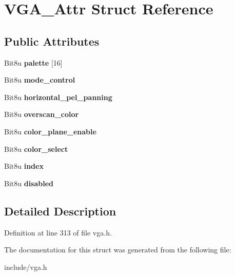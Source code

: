 \hypertarget{structVGA__Attr}{\section{V\-G\-A\-\_\-\-Attr Struct Reference}
\label{structVGA__Attr}
}
\subsection*{Public Attributes}
\begin{DoxyCompactItemize}
\item 
\hypertarget{structVGA__Attr_ad99b88df8836cef9a71a302eef58c6bc}{Bit8u {\bfseries palette} \mbox{[}16\mbox{]}}\label{structVGA__Attr_ad99b88df8836cef9a71a302eef58c6bc}

\item 
\hypertarget{structVGA__Attr_a1b1f9b873cb25af5b2258157ec294b67}{Bit8u {\bfseries mode\-\_\-control}}\label{structVGA__Attr_a1b1f9b873cb25af5b2258157ec294b67}

\item 
\hypertarget{structVGA__Attr_a57f5441e85ade86c8ac8a47db2eee8a6}{Bit8u {\bfseries horizontal\-\_\-pel\-\_\-panning}}\label{structVGA__Attr_a57f5441e85ade86c8ac8a47db2eee8a6}

\item 
\hypertarget{structVGA__Attr_a8728e17ec288d51e4b915af094916daa}{Bit8u {\bfseries overscan\-\_\-color}}\label{structVGA__Attr_a8728e17ec288d51e4b915af094916daa}

\item 
\hypertarget{structVGA__Attr_a87dc770222aa6ab0f30f1dd2288be390}{Bit8u {\bfseries color\-\_\-plane\-\_\-enable}}\label{structVGA__Attr_a87dc770222aa6ab0f30f1dd2288be390}

\item 
\hypertarget{structVGA__Attr_abf6a172f77c5af11b8fe91047af55b98}{Bit8u {\bfseries color\-\_\-select}}\label{structVGA__Attr_abf6a172f77c5af11b8fe91047af55b98}

\item 
\hypertarget{structVGA__Attr_a068d49ae844631d0e0863fbaa6c82df4}{Bit8u {\bfseries index}}\label{structVGA__Attr_a068d49ae844631d0e0863fbaa6c82df4}

\item 
\hypertarget{structVGA__Attr_a6c14506b028f7cdc1b0b57bd2bbf57e2}{Bit8u {\bfseries disabled}}\label{structVGA__Attr_a6c14506b028f7cdc1b0b57bd2bbf57e2}

\end{DoxyCompactItemize}


\subsection{Detailed Description}


Definition at line 313 of file vga.\-h.



The documentation for this struct was generated from the following file\-:\begin{DoxyCompactItemize}
\item 
include/vga.\-h\end{DoxyCompactItemize}
